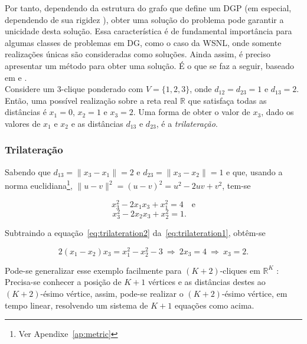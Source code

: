 Por tanto, dependendo da estrutura do grafo que define um DGP (em especial, dependendo de sua rigidez \cite{eren2004rigidity, alfakihEuclideanDistanceMatricesApplicationsRigidity}), obter uma solução do problema pode garantir a unicidade desta solução. Essa característica é de fundamental importância para algumas classes de problemas em DG, como o caso da WSNL, onde somente realizações únicas são consideradas como soluções. Ainda assim, é preciso apresentar um método para obter uma solução.  É o que se faz a seguir, baseado em \cite{libertiEDG} e \cite{trilaterationDong}. 
\\

Considere um 3-clique ponderado com $V = \{1,2,3\}$, onde $d_{12} = d_{23} = 1$ e $d_{13} = 2$. Então, uma possível realização sobre a reta real $\mathbb{R}$ que satisfaça todas as distâncias é $x_1 = 0$, $x_2 = 1$ e $x_3 = 2$. Uma forma de obter o valor de $x_3$, dado os valores de $x_1$ e $x_2$ e as distâncias $d_{13}$ e $d_{23}$, é a \textit{trilateração}.

\subsubsection{Trilateração\label{sec:trilateration}}

 Sabendo que $d_{13} = \lVert x_3 - x_1\rVert = 2$ e $d_{23} = \lVert x_3 - x_2 \rVert = 1$ e que, usando a norma euclidiana\footnote{Ver Apendixe~\ref{ap:metric}}, $\lVert u-v\rVert^2 = (u-v)^2 = u^2 -2uv + v^2$, tem-se

\begin{equation}
	x_3^2 - 2x_1x_3 +x_1^2 = 4 \quad \textrm{e}
	\label{eq:trilateration1}
\end{equation}
\begin{equation}
x_3^2 - 2x_2x_3 +x_2^2 = 1. \quad
\label{eq:trilateration2}
\end{equation}

Subtraindo a equação~\ref{eq:trilateration2} da~\ref{eq:trilateration1}, obtêm-se

\begin{equation*}
	2(x_1-x_2)x_3 = x_1^2 - x_2^2 - 3 \ \Rightarrow \ 2x_3 = 4 \ \Rightarrow \ x_3 = 2.
\end{equation*}

Pode-se generalizar esse exemplo facilmente para $(K+2)$-cliques em $\mathbb{R}^{K}$ \cite{libertiEDG}: Precisa-se conhecer a posição de $K+1$ vértices e as distâncias destes ao $(K+2)$-ésimo vértice, assim, pode-se realizar o $(K+2)$-ésimo vértice, em tempo linear, resolvendo um sistema de $K+1$ equações como acima.
\\

